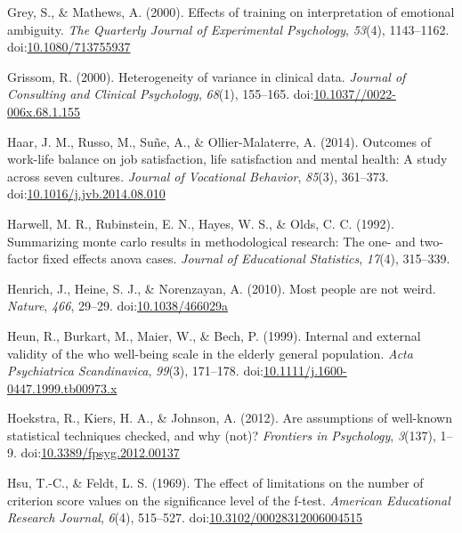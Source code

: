 \documentclass[man,floatsintext]{apa6}
\begin{document}
\leavevmode\hypertarget{ref-Grey_and_Mathiews_2000}{}%
Grey, S., \& Mathews, A. (2000). Effects of training on interpretation of emotional ambiguity. \emph{The Quarterly Journal of Experimental Psychology}, \emph{53}(4), 1143--1162. doi:\href{https://doi.org/10.1080/713755937}{10.1080/713755937}

\leavevmode\hypertarget{ref-Grissom_2000}{}%
Grissom, R. (2000). Heterogeneity of variance in clinical data. \emph{Journal of Consulting and Clinical Psychology}, \emph{68}(1), 155--165. doi:\href{https://doi.org/10.1037//0022-006x.68.1.155}{10.1037//0022-006x.68.1.155}

\leavevmode\hypertarget{ref-Haar_et_al_2014}{}%
Haar, J. M., Russo, M., Suñe, A., \& Ollier-Malaterre, A. (2014). Outcomes of work-life balance on job satisfaction, life satisfaction and mental health: A study across seven cultures. \emph{Journal of Vocational Behavior}, \emph{85}(3), 361--373. doi:\href{https://doi.org/10.1016/j.jvb.2014.08.010}{10.1016/j.jvb.2014.08.010}

\leavevmode\hypertarget{ref-Harwell_et_al_1992}{}%
Harwell, M. R., Rubinstein, E. N., Hayes, W. S., \& Olds, C. C. (1992). Summarizing monte carlo results in methodological research: The one- and two-factor fixed effects anova cases. \emph{Journal of Educational Statistics}, \emph{17}(4), 315--339.

\leavevmode\hypertarget{ref-Henrich_et_al_2010}{}%
Henrich, J., Heine, S. J., \& Norenzayan, A. (2010). Most people are not weird. \emph{Nature}, \emph{466}, 29--29. doi:\href{https://doi.org/10.1038/466029a\%20}{10.1038/466029a }

\leavevmode\hypertarget{ref-Heun_et_al_1999}{}%
Heun, R., Burkart, M., Maier, W., \& Bech, P. (1999). Internal and external validity of the who well-being scale in the elderly general population. \emph{Acta Psychiatrica Scandinavica}, \emph{99}(3), 171--178. doi:\href{https://doi.org/10.1111/j.1600-0447.1999.tb00973.x\%20}{10.1111/j.1600-0447.1999.tb00973.x }

\leavevmode\hypertarget{ref-Hoekstra_et_al_2012}{}%
Hoekstra, R., Kiers, H. A., \& Johnson, A. (2012). Are assumptions of well-known statistical techniques checked, and why (not)? \emph{Frontiers in Psychology}, \emph{3}(137), 1--9. doi:\href{https://doi.org/10.3389/fpsyg.2012.00137}{10.3389/fpsyg.2012.00137}

\leavevmode\hypertarget{ref-Hsu_and_Feldt_1969}{}%
Hsu, T.-C., \& Feldt, L. S. (1969). The effect of limitations on the number of criterion score values on the significance level of the f-test. \emph{American Educational Research Journal}, \emph{6}(4), 515--527. doi:\href{https://doi.org/10.3102/00028312006004515}{10.3102/00028312006004515}
\end{document}

